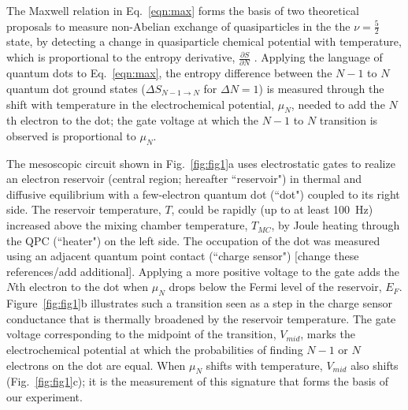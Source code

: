 \documentclass[twocolumn,showpacs,amsmath,amssymb,prl,aps,superscriptaddress]{revtex4-1}
\begin{document}
The Maxwell relation in Eq.~\ref{eqn:max} forms the basis of two theoretical proposals to measure non-Abelian exchange of quasiparticles in the the $\nu = \frac{5}{2}$ state, by detecting a change in quasiparticle chemical potential with temperature, which is proportional to the entropy derivative, $\frac{\partial S}{\partial N}$ \cite{Cooper2009,Ben-Shach2013}. Applying the language of quantum dots to Eq.~\ref{eqn:max}, the entropy difference between the $N-1$ to $N$ quantum dot ground states ($\Delta S_{N-1\rightarrow N}$ for $\Delta N=1$) is measured through the shift with temperature in the electrochemical potential, $\mu_N$, needed to add the $N$th electron to the dot; the gate voltage at which the $N-1$ to $N$ transition is observed is  proportional to $\mu_{N}$.

The mesoscopic circuit shown in Fig.~\ref{fig:fig1}a uses electrostatic gates to realize an electron reservoir (central region; hereafter ``reservoir") in thermal and diffusive equilibrium with a few-electron quantum dot (``dot") coupled to its right side.  The reservoir temperature, $T$, could be rapidly (up to at least \SI{100}{\hertz}) increased above the mixing chamber temperature, $T_{MC}$, by Joule heating through the QPC (``heater") on the left side.  The occupation of the dot was measured using an adjacent quantum point contact (``charge sensor") \cite{Field1993, Staring2007, Thierschmann2015} [change these references/add additional].  Applying a more positive voltage to the gate adds the $N$th electron to the dot when $\mu_{N}$ drops below the Fermi level of the reservoir, $E_F$. Figure~\ref{fig:fig1}b illustrates such a transition \textemdash seen as a step in the charge sensor conductance \textemdash that is thermally broadened by the reservoir temperature.  The gate voltage corresponding to the midpoint of the transition, $V_{mid}$, marks the electrochemical potential at which the probabilities of finding $N-1$ or $N$ electrons on the dot are equal.  When $\mu_N$ shifts with temperature, $V_{mid}$ also shifts (Fig.~\ref{fig:fig1}c); it is the measurement of this signature that forms the basis of our experiment.
\end{document}

